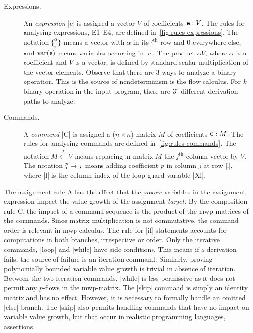 \begin{description}
\item[Expressions.]
An \emph{expression} \pr|e| is assigned a vector \(V\) of coefficients \(\prm{e} : V\).
The rules for analysing expressions, E1--E4, are defined in~\autoref{fig:rules-expressions}.
The notation \(\{_{i}^{\alpha}\}\) means a vector with \(\alpha\) in its \(i^\text{th}\) row and $0$ everywhere else, and \(\var(\prm{e})\) means variables occurring in \pr|e|.
The product \(\alpha V\), where \(\alpha\) is a coefficient and \(V\) is a vector, is defined by
standard scalar multiplication of the vector elements.
Observe that there are 3 ways to analyze a binary operation.
This is the source of nondeterminism is the flow calculus.
For \(k\) binary operation in the input program, there are \(3^k\) different derivation paths to analyze.
\item[Commands.]
A \emph{command} \pr|C| is assigned a (\(n \times n\)) matrix \(M\) of coefficients \(\prm{C} : M\).
The rules for analysing commands are defined in~\autoref{fig:rules-commands}.
The notation \(M \xleftarrow{j} V\) means replacing in matrix $M$ the \(j^\text{th}\) column vector by $V$.
The notation \(_{\text{\pr|l|}}^{p}\rightarrow j\) means adding coefficient \(p\) in column \(j\) at row \pr|l|,
where \pr|l| is the column index of the loop guard variable \pr|Xl|.
\end{description}
The assignment rule A has the effect that the \emph{source} variables in the assignment expression impact the value growth of the assignment \emph{target}.
By the composition rule C, the impact of a command sequence is the product of the mwp-matrices of the commands.
Since matrix multiplication is not commutative, the command order is relevant in mwp-calculus.
The rule for \pr|if| statements accounts for computations in both branches, irrespective or order.
Only the iterative commands, \pr|loop| and \pr|while| have side conditions.
This means if a derivation fails, the source of failure is an iteration command.
Similarly, proving polynomially bounded variable value growth is trivial in absence of iteration.
Between the two iteration commands, \pr|while| is less permissive as it does not permit any \(p\)-flows in the mwp-matrix.
The \pr|skip| command is simply an identity matrix and has no effect.
However, it is necessary to formally handle \eg an omitted \pr|else| branch.
The \pr|skip| also permits handling commands that have no impact on variable value growth,
but that occur in realistic programming languages, \eg assertions.

